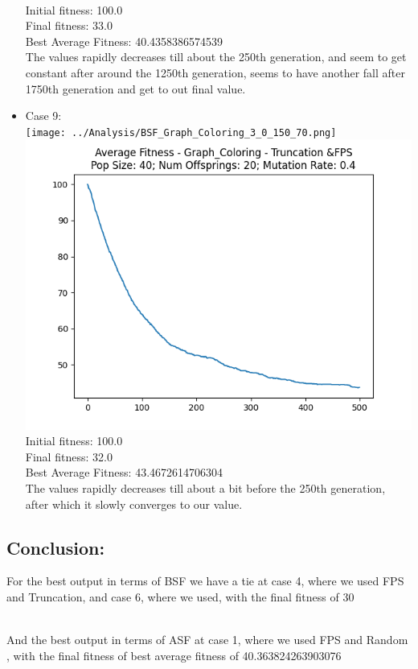 \documentclass[12pt]{report} %
\begin{document}
\begin{itemize}
	      \\Initial fitness:  100.0
	      \\Final fitness:  33.0
	      \\Best Average Fitness: 40.4358386574539
	      \\The values rapidly decreases till about the 250th generation, and seem to get constant after around the 1250th generation, seems to have another fall after 1750th generation and get to out final value.
	\item Case 9:\\
	      \texttt{[image: ../Analysis/BSF\_Graph\_Coloring\_3\_0\_150\_70.png]}
	      \includegraphics[scale=0.5]{../Analysis/ASF_Graph_Coloring_3_0_40_20.png}
	      \\Initial fitness:  100.0
	      \\Final fitness:  32.0
	      \\Best Average Fitness: 43.4672614706304
	      \\The values rapidly decreases till about a bit before the 250th generation, after which it slowly converges to our value.
\end{itemize}


\subsection*{Conclusion:}
For the best output in terms of BSF we have a tie at case 4, where we used FPS and Truncation, and case 6, where we used, with the final fitness of 30

\\And the best output in terms of ASF at case 1, where we used FPS and Random , with the final fitness of best average fitness of 40.363824263903076
\end{document}
